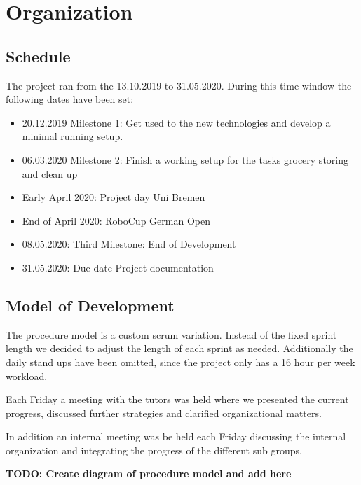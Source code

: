 \documentclass[main.tex]{subfiles}
\begin{document}
	\chapter{Organization}
	\label{organisation}
	
	\section{Schedule}
	The project ran from the 13.10.2019 to 31.05.2020. During this time window the following dates have been set:
	\begin{itemize}
		\item 20.12.2019 Milestone 1: Get used to the new technologies and develop a minimal running setup.
		\item 06.03.2020 Milestone 2: Finish a working setup for the tasks grocery storing and clean up
		\item Early April 2020: Project day Uni Bremen
		\item End of April 2020: RoboCup German Open
		\item 08.05.2020: Third Milestone: End of Development
		\item 31.05.2020: Due date Project documentation
	\end{itemize} 

	\section{Model of Development}
	The procedure model is a custom scrum variation. Instead of the fixed sprint length we decided to adjust the length of each sprint as needed. Additionally the daily stand ups have been omitted, since the project only has a 16 hour per week workload.
	
	Each Friday a meeting with the tutors was held where we presented the current progress, discussed further strategies and clarified organizational matters.
	
	In addition an internal meeting was be held each Friday discussing the internal organization and integrating the progress of the different sub groups.
	
	\textbf{TODO: Create diagram of procedure model and add here}
\end{document}
